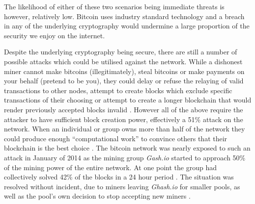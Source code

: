 \documentclass{article}
\begin{document}
The likelihood of either of these two scenarios being immediate threats is however, relatively low. Bitcoin uses industry standard technology and a breach in any of the underlying cryptography would undermine a large proportion of the security we enjoy on the internet. 

Despite the underlying cryptography being secure, there are still a number of possible attacks which could be utilised against the network. While a dishonest miner cannot make bitcoins (illegitimately), steal bitcoins or make payments on your behalf (pretend to be you), they could delay or refuse the relaying of valid transactions to other nodes, attempt to create blocks which exclude specific transactions of their choosing or attempt to create a longer blockchain that would render previously accepted blocks invalid \citep{22_brave_new_coin_2016}. However all of the above require the attacker to have sufficient block creation power, effectively a 51\% attack on the network. When an individual or group owns more than half of the network they could produce enough ``computational work'' to convince others that their blockchain is the best choice \citep{41_yang_2011}. The bitcoin network was nearly exposed to such an attack in January of 2014 as the mining group \textit{Gash.io} started to approach 50\% of the mining power of the entire network. At one point the group had collectively solved 42\% of the blocks in a 24 hour period \citep{42_liu_2014}. The situation was resolved without incident, due to miners leaving \textit{Ghash.io} for smaller pools, as well as the pool’s own decision to stop accepting new miners \citep{41_yang_2011}.
\end{document}
